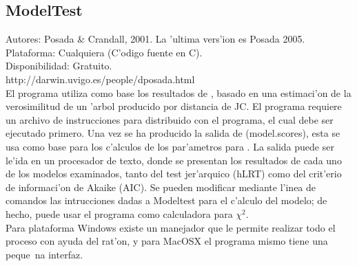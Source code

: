 \subsection{ModelTest}
\noindent
Autores: Posada \& Crandall, 2001. La 'ultima vers'ion es Posada 2005.
\\Plataforma: Cualquiera (C'odigo fuente en C).\\
Disponibilidad: Gratuito.\\
http://darwin.uvigo.es/people/dposada.html
\\
El programa utiliza como base los resultados de , basado en una estimaci'on de la verosimilitud de un 'arbol producido por distancia de JC. El programa requiere un archivo de instrucciones para  distribuido con el programa, el cual debe ser ejecutado primero. Una vez se ha producido la salida de  (model.scores), esta se usa como base para los c'alculos de los par'ametros para . La salida puede ser le'ida en un procesador de texto, donde se presentan los resultados de cada uno de los modelos examinados, tanto del test jer'arquico (hLRT) como del crit'erio de informaci'on de Akaike (AIC). Se pueden modificar mediante l'inea de comandos las intrucciones dadas a Modeltest para el c'alculo del modelo; de hecho, puede usar el programa como calculadora para $\chi ^2$.\\
Para plataforma Windows existe un manejador que le permite realizar todo el proceso con ayuda del rat'on, y para MacOSX el programa mismo tiene una peque~na interfaz.